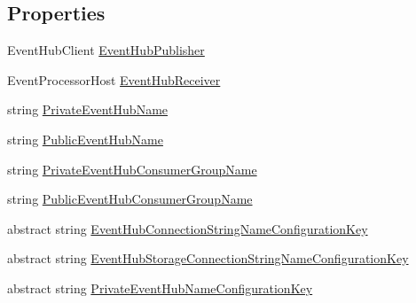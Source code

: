 \subsection*{Properties}
\begin{DoxyCompactItemize}
\item 
Event\+Hub\+Client \hyperlink{classCqrs_1_1Azure_1_1ServiceBus_1_1AzureEventHub_a5f64ce36efaee0f676816c803620d05e}{Event\+Hub\+Publisher}
\item 
Event\+Processor\+Host \hyperlink{classCqrs_1_1Azure_1_1ServiceBus_1_1AzureEventHub_a1b12b47dbb9b9afe2014477a2e457c35}{Event\+Hub\+Receiver}
\item 
string \hyperlink{classCqrs_1_1Azure_1_1ServiceBus_1_1AzureEventHub_ac6802047e00a92ea4b0ae6b69ef7310a}{Private\+Event\+Hub\+Name}
\item 
string \hyperlink{classCqrs_1_1Azure_1_1ServiceBus_1_1AzureEventHub_a6012f2290f9397929e9d6d5419963482}{Public\+Event\+Hub\+Name}
\item 
string \hyperlink{classCqrs_1_1Azure_1_1ServiceBus_1_1AzureEventHub_a0c091d0cb19dda3e8bfc20f0e7d30af3}{Private\+Event\+Hub\+Consumer\+Group\+Name}
\item 
string \hyperlink{classCqrs_1_1Azure_1_1ServiceBus_1_1AzureEventHub_a505c495eb73e4f888431d408e0b0d8ab}{Public\+Event\+Hub\+Consumer\+Group\+Name}
\item 
abstract string \hyperlink{classCqrs_1_1Azure_1_1ServiceBus_1_1AzureEventHub_ad77526406b246313591e11b90e1a67d5}{Event\+Hub\+Connection\+String\+Name\+Configuration\+Key}
\item 
abstract string \hyperlink{classCqrs_1_1Azure_1_1ServiceBus_1_1AzureEventHub_ad400a17bf61c218e6330cd6500458801}{Event\+Hub\+Storage\+Connection\+String\+Name\+Configuration\+Key}
\item 
abstract string \hyperlink{classCqrs_1_1Azure_1_1ServiceBus_1_1AzureEventHub_a286a7ddc6becff4d549434d2abe82ed1}{Private\+Event\+Hub\+Name\+Configuration\+Key}

\end{DoxyCompactItemize}
